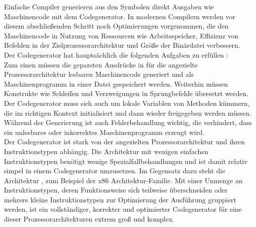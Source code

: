 Einfache Compiler generieren aus den Symbolen direkt Ausgaben wie Maschinencode mit dem Codegenerator.
In modernen Compilern werden vor diesem abschließenden Schritt noch Optimierungen vorgenommen, die den Maschinencode in Nutzung von Ressourcen wie Arbeitsspeicher, Effizienz von Befehlen in der Zielprozessorarchitektur und Größe der Binärdatei verbessern.\\

Der Codegenerator hat hauptsächlich die folgenden Aufgaben zu erfüllen \cite{mossenbock:2024}:\\
Zum einen müssen die geparsten Ausdrücke in für die angezielte Prozessorarchitektur lesbaren Maschinencode generiert und als Maschinenprogramm in einer Datei gespeichert werden.
Weiterhin müssen Konstrukte wie Schleifen und Verzweigungen in Sprungbefehle übersetzt werden.
Der Codegenerator muss sich auch um lokale Variablen von Methoden kümmern, die im richtigen Kontext initialisiert und dann wieder freigegeben werden müssen.\\
Während der Generierung ist auch Fehlerbehandlung wichtig, die verhindert, dass ein unlesbares oder inkorrektes Maschinenprogramm erzeugt wird.\\

Der Codegenerator ist stark von der angezielten Prozessorarchitektur und ihren Instruktionstypen abhängig.
Die  Architektur mit wenigen einfachen Instruktionstypen benötigt wenige Spezialfallbehandlungen und ist damit relativ simpel in einem Codegenerator umzusetzen.
Im Gegensatz dazu steht die Architektur , zum Beispiel der x86 Architektur-Familie. 
Mit einer Unmenge an Instruktionstypen, deren Funktionsweise sich teilweise überschneiden oder mehrere kleine Instruktionstypen zur Optimierung der Ausführung gruppiert werden, ist ein vollständiger, korrekter und optimierter Codegenerator für eine dieser Prozessorarchitekturen extrem groß und komplex.
